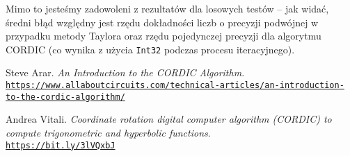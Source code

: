 \documentclass{mwart}
\theoremstyle{remark}
\theoremstyle{definition}
\theoremstyle{definition}
\begin{document}
Mimo to jesteśmy zadowoleni z rezultatów dla losowych testów -- jak widać, średni błąd względny jest rzędu dokładności liczb o precyzji podwójnej w przypadku metody Taylora oraz rzędu pojedynczej precyzji dla algorytmu CORDIC (co wynika z użycia \texttt{Int32} podczas procesu iteracyjnego).

\begin{thebibliography}{9}
  Steve Arar.
  \textit{An Introduction to the CORDIC Algorithm}. 
  \\\texttt{\url{https://www.allaboutcircuits.com/technical-articles/an-introduction-to-the-cordic-algorithm/}}
  
  Andrea Vitali.
  \textit{Coordinate rotation digital computer algorithm (CORDIC)
    to compute trigonometric and hyperbolic functions}.
  \\\texttt{\url{https://bit.ly/3lVQxbJ}}
\end{thebibliography}
\end{document}

